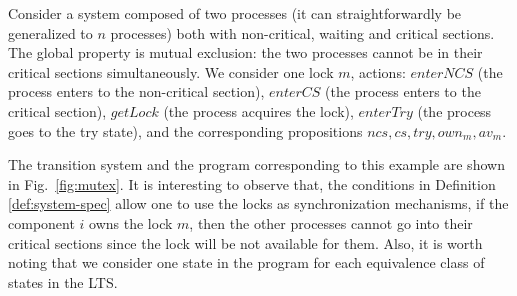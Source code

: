 \begin{example}[Mutex]  
\label{ex:mutex-ts}
Consider a system composed of two processes (it can straightforwardly be generalized to $n$ processes) both with non-critical, waiting and critical sections. The global property  is mutual exclusion: the two processes cannot be in their critical sections simultaneously. We consider one lock $m$,  actions: $\mathit{enterNCS}$ (the process enters to the non-critical section), $\mathit{enterCS}$ (the process enters to the critical section), $\mathit{getLock}$ (the process acquires the lock), $\mathit{enterTry}$ (the process goes to the try state), and the corresponding propositions $\mathit{ncs}, \mathit{cs}, \mathit{try}, \mathit{own}_m, \mathit{av}_m$.  

The transition system and the program corresponding to this example are shown in Fig.~\ref{fig:mutex}. It is interesting to observe that,  the  conditions in Definition \ref{def:system-spec} allow one to use the locks as synchronization mechanisms, if the component $i$ owns the lock $m$, then the other processes cannot go into their critical sections since the lock will be not available for them. Also,  it is worth noting that we consider one state in the program for each equivalence class of states in the LTS.
\end{example}

